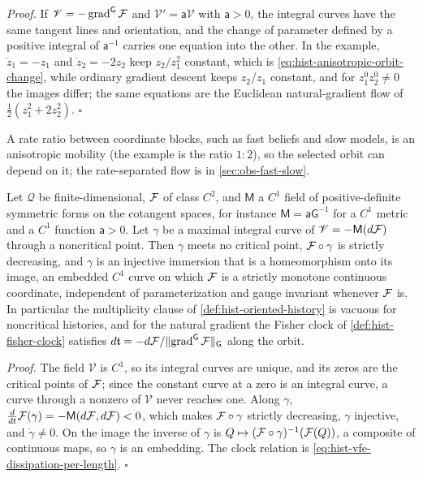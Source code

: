 \noindent\emph{Proof.}
If $\mathscr V=-\operatorname{grad}^{\mathsf G}\mathcal F$ and $\mathscr V'=\mathsf
a\mathscr V$ with $\mathsf a>0$, the integral curves have the same tangent lines and
orientation, and the change of parameter defined by a positive integral of
$\mathsf a^{-1}$ carries one equation into the other.  In the example, $\dot z_1=-z_1$
and $\dot z_2=-2z_2$ keep $z_2/z_1^2$ constant, which is
\eqref{eq:hist-anisotropic-orbit-change}, while ordinary gradient descent keeps
$z_2/z_1$ constant, and for $z_1^0z_2^0\ne0$ the images differ; the same equations are
the Euclidean natural-gradient flow of $\tfrac12(z_1^2+2z_2^2)$.  $\square$

A rate ratio between coordinate blocks, such as fast beliefs and slow models, is an
anisotropic mobility (the example is the ratio $1:2$), so the selected orbit can depend
on it; the rate-separated flow is in \cref{sec:obs-fast-slow}.

Let $\mathcal Q$ be finite-dimensional, $\mathcal F$ of class $C^2$, and $\mathsf M$ a
$C^1$ field of positive-definite symmetric forms on the cotangent spaces, for instance
$\mathsf M=\mathsf a\mathsf G^{-1}$ for a $C^1$ metric and a $C^1$ function
$\mathsf a>0$.  Let $\gamma$ be a maximal integral curve of
$\mathscr V=-\mathsf M(d\mathcal F)$ through a noncritical point.  Then $\gamma$ meets no
critical point, $\mathcal F\circ\gamma$ is strictly decreasing, and $\gamma$ is an injective
immersion that is a homeomorphism onto its image, an embedded $C^1$ curve on which
$\mathcal F$ is a strictly monotone continuous coordinate, independent of parameterization
and gauge invariant whenever $\mathcal F$ is.  In particular the multiplicity clause of
\cref{def:hist-oriented-history} is vacuous for noncritical histories, and for the
natural gradient the Fisher clock of \cref{def:hist-fisher-clock} satisfies
$d\mathfrak t=-d\mathcal F/\lVert\operatorname{grad}^{\mathsf G}\mathcal F\rVert_{\mathsf G}$
along the orbit.  

\noindent\emph{Proof.}
The field $\mathscr V$ is $C^1$, so its integral curves are unique, and its zeros are the
critical points of $\mathcal F$; since the constant curve at a zero is an integral curve, a
curve through a nonzero of $\mathscr V$ never reaches one.  Along $\gamma$,
$\tfrac{d}{dt}\mathcal F(\gamma)=-\mathsf M(d\mathcal F,d\mathcal F)<0$, which makes
$\mathcal F\circ\gamma$ strictly decreasing, $\gamma$ injective, and $\dot\gamma\ne0$.  On
the image the inverse of $\gamma$ is $Q\mapsto(\mathcal F\circ\gamma)^{-1}(\mathcal F(Q))$, a
composite of continuous maps, so $\gamma$ is an embedding.  The clock relation is
\eqref{eq:hist-vfe-dissipation-per-length}.  $\square$

